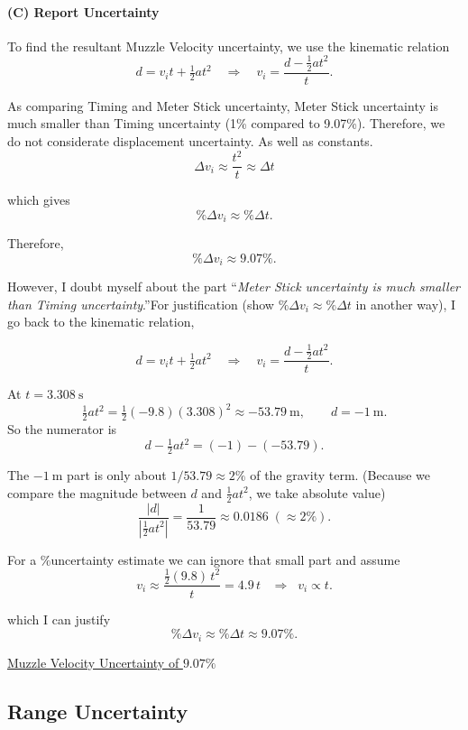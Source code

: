 \documentclass[12pt]{article}
\begin{document}
\paragraph{(C) Report Uncertainty}
To find the resultant Muzzle Velocity uncertainty, we use the kinematic relation
\[
d = v_i t + \tfrac12 a t^2 \quad\Rightarrow\quad
v_i = \frac{d - \tfrac12 a t^2}{t}.
\]

\vspace{1em}
As comparing Timing and Meter Stick uncertainty, 
Meter Stick uncertainty is much smaller than Timing uncertainty (1\% compared to 9.07\%). 
Therefore, we do not considerate displacement uncertainty. As well as constants.
\[
\Delta v_i \approx \frac{t^2}{t} \approx \Delta t
\]

which gives 
\[
\%\Delta v_i \approx \%\Delta t.
\]

Therefore, 
\[
\%\Delta v_i \approx 9.07\%.
\]
\vspace{1em}

However, I doubt myself about the part ``\emph{Meter Stick uncertainty is much smaller than Timing uncertainty}.''For justification (show $\%\Delta v_i \approx \%\Delta t$ in another way), I go back to the kinematic relation,

\[
d = v_i t + \tfrac12 a t^2 \quad\Rightarrow\quad
v_i = \frac{d - \tfrac12 a t^2}{t}.
\]

At $t=3.308~\mathrm{s}$
\[
\tfrac12 a t^2 = \tfrac12(-9.8)(3.308)^2 \approx -53.79~\mathrm{m},\qquad d=-1~\mathrm{m}.
\]
\vspace{1em}
So the numerator is
\[
d-\tfrac12 a t^2 = (-1)-(-53.79).
\]

The $-1~\mathrm{m}$ part is only about $1/53.79\approx 2\%$ of the gravity term. (Because we compare the magnitude between $d$ and $\tfrac12 a t^2$, we take absolute value)
\[
\frac{|d|}{\left|\tfrac{1}{2} a t^2\right|}
= \frac{1}{53.79}
\approx 0.0186 \; (\approx 2\%).
\]

For a $\%$uncertainty estimate we can ignore that small part and assume
\[
v_i \approx \frac{ \tfrac12(9.8)\,t^2 }{t} = 4.9\,t  \;\;\;\Rightarrow\;\; v_i \propto t.
\]

which I can justify
\[
\%\Delta v_i \approx  \%\Delta t \approx \boxed{9.07\%}.
\]

\vspace{1em}

\noindent\hfill\underline{Muzzle Velocity Uncertainty of $9.07\%$}


\subsection{Range Uncertainty}
\end{document}
